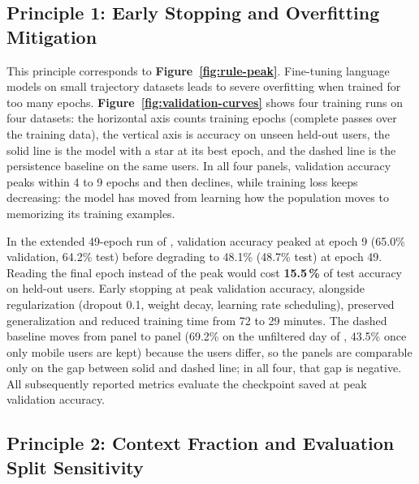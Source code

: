 \subsection{Principle 1: Early Stopping and Overfitting Mitigation}

This principle corresponds to \textbf{Figure~\ref{fig:rule-peak}}. Fine-tuning language models on small trajectory datasets leads to severe overfitting when trained for too many epochs. \textbf{Figure~\ref{fig:validation-curves}} shows four training runs on four datasets: the horizontal axis counts training epochs (complete passes over the training data), the vertical axis is accuracy on unseen held-out users, the solid line is the model with a star at its best epoch, and the dashed line is the persistence baseline on the same users. In all four panels, validation accuracy peaks within 4 to 9 epochs and then declines, while training loss keeps decreasing: the model has moved from learning how the population moves to memorizing its training examples.





In the extended 49-epoch run of \textbf{}, validation accuracy peaked at epoch 9 (65.0\% validation, 64.2\% test) before degrading to 48.1\% (48.7\% test) at epoch 49. Reading the final epoch instead of the peak would cost \textbf{15.5\,\%} of test accuracy on held-out users. Early stopping at peak validation accuracy, alongside regularization (dropout 0.1, weight decay, learning rate scheduling), preserved generalization and reduced training time from 72 to 29 minutes. The dashed baseline moves from panel to panel (69.2\% on the unfiltered day of \textbf{}, 43.5\% once only mobile users are kept) because the users differ, so the panels are comparable only on the gap between solid and dashed line; in all four, that gap is negative. All subsequently reported metrics evaluate the checkpoint saved at peak validation accuracy.

\FloatBarrier

\subsection{Principle 2: Context Fraction and Evaluation Split Sensitivity}

